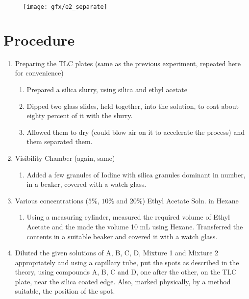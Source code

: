 	\begin{figure}[bth]
		\begin{center}
			\texttt{[image: gfx/e2\_separate]}
		\end{center}
	\caption[Diagrammatic representation of the test setup]{\label{1A_slides}}
	\end{figure}


\section{Procedure}	
	\begin{enumerate}
		\item Preparing the TLC plates (same as the previous experiment, repeated here for convenience)
		\begin{enumerate}
			\item Prepared a silica slurry, using silica and ethyl acetate
			\item Dipped two glass slides, held together, into the solution, to coat about eighty percent of it with the slurry.
			\item Allowed them to dry (could blow air on it to accelerate the process) and them separated them.	
		\end{enumerate}
		\item Visibility Chamber (again, same)
		\begin{enumerate}
			\item Added a few granules of Iodine with silica granules dominant in number, in a beaker, covered with a watch glass.
		\end{enumerate}
		\item Various concentrations ($5\%$, $10\%$ and $20\%$) Ethyl Acetate Soln. in Hexane
		\begin{enumerate}
			\item Using a measuring cylinder, measured the required volume of Ethyl Acetate and the made the volume 10 mL using Hexane. Transferred the contents in a suitable beaker and covered it with a watch glass.
		\end{enumerate}
		\item Diluted the given solutions of A, B, C, D, Mixture 1 and Mixture 2 appropriately and using a capillary tube, put the spots as described in the theory, using compounds A, B, C and D, one after the other, on the TLC plate, near the silica coated edge. Also, marked physically, by a method suitable, the position of the spot. 

\end{enumerate}

